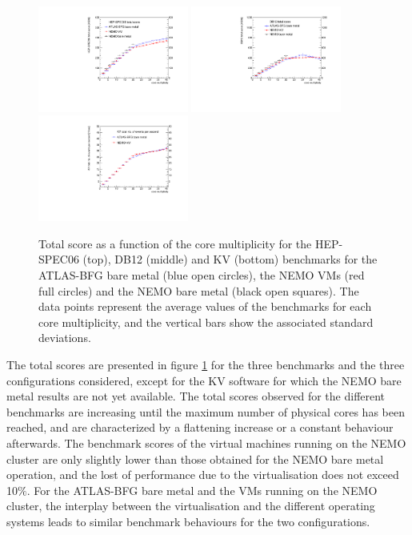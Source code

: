 \begin{figure}[htbp]
\centering
\includegraphics[width=0.44\textwidth]{figures/benchmark-hepspec06-total.pdf}
\includegraphics[width=0.44\textwidth]{figures/DB12-BFG-BM-NEMO-VM-NEMO-BM-total.pdf} 
\includegraphics[width=0.44\textwidth]{figures/kv-BFG-BM-NEMO-VM-NEMO-BM-total.pdf} 
\caption{Total score as a function of the core multiplicity for the HEP-SPEC06 (top), DB12 (middle) and KV (bottom) benchmarks
for the ATLAS-BFG bare metal (blue open circles), the NEMO VMs (red full circles) and the NEMO bare metal (black open squares). The data points represent
the average values of the benchmarks for each core multiplicity, and the vertical bars show the associated standard deviations.}
\label{bmk-total}
\end{figure}

The total scores are presented in figure \ref{bmk-total} for the three benchmarks and the three configurations considered, except for the KV software for which the NEMO bare metal
results are not yet available. The total scores observed for the different benchmarks are increasing until the maximum number of physical cores has been reached, and are characterized by a flattening increase
or a constant behaviour afterwards. The benchmark scores of the virtual machines running on the NEMO cluster are only slightly lower than those obtained for the NEMO bare metal operation, and the lost of performance
due to the virtualisation does not exceed 10$\%$. For the ATLAS-BFG bare metal and the VMs running on the NEMO cluster, the interplay between the virtualisation and the different operating systems leads
to similar benchmark behaviours for the two configurations.

